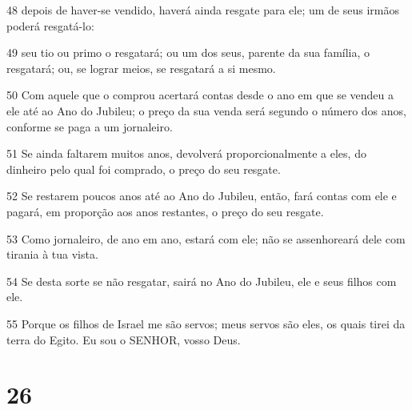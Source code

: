 \par 48 depois de haver-se vendido, haverá ainda resgate para ele; um de seus irmãos poderá resgatá-lo:
\par 49 seu tio ou primo o resgatará; ou um dos seus, parente da sua família, o resgatará; ou, se lograr meios, se resgatará a si mesmo.
\par 50 Com aquele que o comprou acertará contas desde o ano em que se vendeu a ele até ao Ano do Jubileu; o preço da sua venda será segundo o número dos anos, conforme se paga a um jornaleiro.
\par 51 Se ainda faltarem muitos anos, devolverá proporcionalmente a eles, do dinheiro pelo qual foi comprado, o preço do seu resgate.
\par 52 Se restarem poucos anos até ao Ano do Jubileu, então, fará contas com ele e pagará, em proporção aos anos restantes, o preço do seu resgate.
\par 53 Como jornaleiro, de ano em ano, estará com ele; não se assenhoreará dele com tirania à tua vista.
\par 54 Se desta sorte se não resgatar, sairá no Ano do Jubileu, ele e seus filhos com ele.
\par 55 Porque os filhos de Israel me são servos; meus servos são eles, os quais tirei da terra do Egito. Eu sou o SENHOR, vosso Deus.

\chapter{26}

